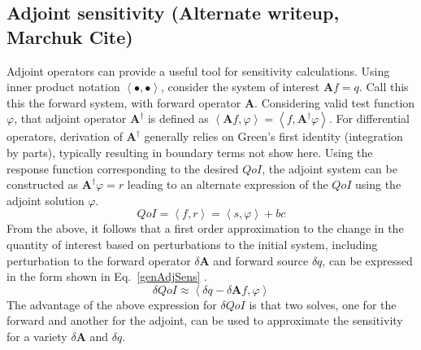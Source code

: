 \documentclass{article}
\newcommand{\bra}{\left\langle}
\newcommand{\ket}{\right\rangle}
\newcommand{\qoi}{QoI}
\begin{document}
\subsection{Adjoint sensitivity (Alternate writeup, Marchuk Cite)}

Adjoint operators can provide a useful tool for sensitivity calculations. Using inner product notation $\bra \bullet , \bullet \ket$, consider the system of interest $\mathbf{A}f = q$. Call this this the forward system, with forward operator $\mathbf{A}$. Considering valid test function $\varphi$, that adjoint operator $\mathbf{A^\dag}$ is defined as $\bra \mathbf{A} f, \varphi \ket = \bra f, \mathbf{A^\dag} \varphi \ket $. For differential operators, derivation of $\mathbf{A^\dag}$ generally relies on Green's first identity (integration by parts), typically resulting in boundary terms not show here. Using the response function corresponding to the desired $\qoi$, the adjoint system can be constructed as $\mathbf{A^\dag} \varphi=r$ leading to an alternate expression of the $\qoi$ using the adjoint solution $\varphi$.
\begin{equation}
\label{genAdjQoI}
\qoi = \bra f, r \ket = \bra s , \varphi \ket + bc
\end{equation} 
From the above, it follows that a first order approximation to the change in the quantity of interest based on perturbations to the initial system, including perturbation to the forward operator $\delta \mathbf{A}$ and forward source $\delta q$, can be expressed in the form shown in Eq.~\eqref{genAdjSens} \cite{Marchuk}.
\begin{equation}
\label{genAdjSens}
\delta \qoi \approx \bra \delta q - \delta \mathbf{A} f , \varphi \ket 
\end{equation}
The advantage of the above expression for $\delta \qoi$ is that two solves, one for the forward and another for the adjoint, can be used to approximate the sensitivity for a variety $\delta \mathbf{A}$ and $\delta q$.

 
\end{document}
